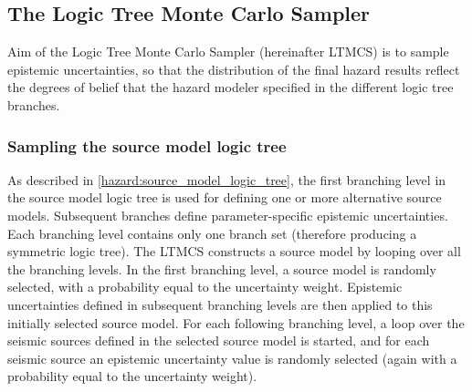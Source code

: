 \subsection{The Logic Tree Monte Carlo Sampler}
Aim of the Logic Tree Monte Carlo Sampler (hereinafter LTMCS) is to sample 
epistemic uncertainties, so that the distribution of the final hazard results
reflect the degrees of belief that the hazard modeler specified in the 
different logic tree branches.\\
%
\subsubsection{Sampling the source model logic tree}
As described in \ref{hazard:source_model_logic_tree}, the first branching 
level in the source model logic tree is used for defining one or more 
alternative source models. Subsequent branches define parameter-specific 
epistemic uncertainties. Each branching level contains only one branch set 
(therefore producing a symmetric logic tree). The LTMCS constructs a source 
model by looping over all the branching levels. In the first branching level, 
a source model is randomly selected, with a probability equal to the 
uncertainty weight. Epistemic uncertainties defined in subsequent branching 
levels are then applied to this initially selected source model. For each 
following branching level, a loop over the seismic sources defined in the 
selected source model is started, and for each seismic source an epistemic 
uncertainty value is randomly selected (again with a probability equal to 
the uncertainty weight).
